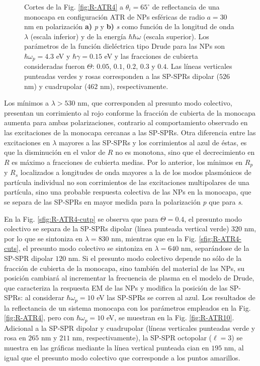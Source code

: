 \begin{figure}[h!]
	\caption{Cortes de la Fig. \ref{fig:R-ATR4} a $\theta_i = 65^\circ$ de reflectancia de una monocapa en configuración ATR de NPs esféricas de radio $a=30$ nm en polarización \textbf{a)} \emph{p} y \textbf{b)} \emph{s} como función de la longitud de onda $\lambda$ (escala inferior) y de la energía $\hbar \hbar\omega$ (escala superior). Los parámetros de la función dieléctrica tipo Drude para las NPs son $\hbar\omega_p = 4.3$ eV y $\hbar\gamma = 0.15$ eV y las fracciones de cubierta consideradas fueron $\Theta$: $0. 05$, $0. 1$, $0. 2$, $0. 3$ y $0. 4$. Las líneas verticales punteadas verdes y rosas corresponden a las SP-SPRs dipolar ($526$ nm) y cuadrupolar ($462$ nm), respectivamente. }\label{fig:R-ATR4-Cuts}
	\end{figure}	  

Los mínimos a $\lambda>530$ nm, que corresponden al presunto modo colectivo, presentan un corrimiento al rojo conforme la fracción de cubierta de la monocapa aumenta  para ambas polarizaciones, contrario al comportamiento observado en las excitaciones de la monocapa cercanas a las SP-SPRs. Otra diferencia entre las excitaciones en $\lambda$ mayores a las SP-SPRs y los corrimientos al azul de éstas, es que la disminución en el valor de $R$ no es monotona, sino que el decrecimiento en $R$ es máximo a fracciones de cubierta medias. Por lo anterior, los mínimos en $R_p$ y $R_s$ localizados a longitudes de onda mayores a la de los modos plasmónicos de partícula individual no son corrimientos de las excitaciones multipolares de una partícula, sino una probable respuesta colectiva de las NPs en la monocapa, que se separa de las SP-SPRs en mayor medida para la polarización \emph{p} que para \emph{s}.

En la Fig. \ref{sfig:R-ATR4-cutp} se observa que para $\Theta = 0.4$, el presunto modo colectivo se separa de la SP-SPRs dipolar (línea punteada vertical verde) $320$ nm, por lo que se sintoniza en $\lambda=830$ nm, mientras que en la Fig. \ref{sfig:R-ATR4-cuts}, el presunto modo colectivo se sintoniza en $\lambda = 640$ nm, separándose de la SP-SPR dipolar $120$ nm. Si el presunto modo colectivo depende no sólo de la fracción de cubierta de la monocapa, sino también del material de las NPs, su posición cambiará al incrementar la frecuencia de plasma en el modelo de Drude, que caracteriza la respuesta EM de las NPs y modifica la posición de las SP-SPRs: al considerar $\hbar\omega_p = 10$ eV las SP-SPRs se corren al azul. Los resultados de la reflectancia de un sistema monocapa con los parámetros empleados en la Fig. \ref{fig:R-ATR4}, pero con $\hbar\omega_p = 10$ eV, se muestran en la Fig. \ref{fig:R-ATR10}. Adicional a la SP-SPR dipolar y cuadrupolar (líneas verticales punteadas verde y rosa en $265$ nm y $211$ nm, respectivamente), la SP-SPR octopolar ($\ell = 3$) se muestra en las gráficas mediante la línea vertical punteada cian en $195$ nm, al igual que el presunto modo colectivo que corresponde a los puntos amarillos.
	
